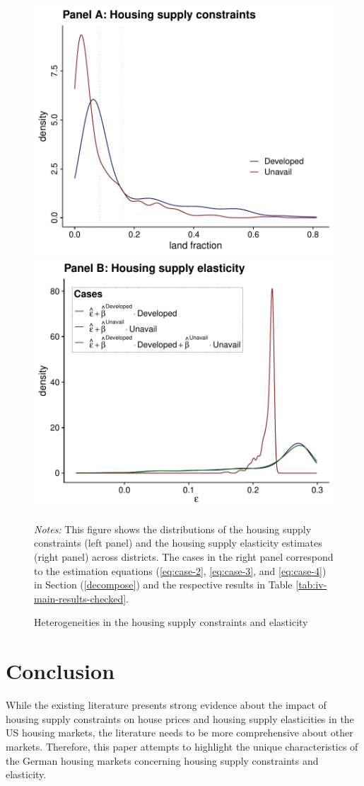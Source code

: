 \documentclass[
  12pt,
]{article}
\begin{document}
\begin{figure}[H]
\centering

\begin{center}\includegraphics[width=0.495\linewidth]{output/figs/distributions-elasticity-constraints-1} \includegraphics[width=0.495\linewidth]{output/figs/distributions-elasticity-constraints-2} \end{center}

\caption{Heterogeneities in the housing supply constraints and elasticity}\label{fig:distributions-elasticity-constraints}
\medskip
\begin{minipage}{0.9\textwidth}
\footnotesize
\textit{Notes:} This figure shows the distributions of the housing supply constraints (left panel) and the housing supply elasticity estimates (right panel) across districts. The cases in the right panel correspond to the estimation equations (\ref{eq:case-2}, \ref{eq:case-3}, and \ref{eq:case-4}) in Section (\ref{decompose}) and the respective results in Table \ref{tab:iv-main-results-checked}.  
\end{minipage}
\end{figure}

\section{Conclusion}\label{conclusion}

While the existing literature presents strong evidence about the impact of housing supply constraints on house prices and housing supply elasticities in the US housing markets, the literature needs to be more comprehensive about other markets. Therefore, this paper attempts to highlight the unique characteristics of the German housing markets concerning housing supply constraints and elasticity.
\end{document}
